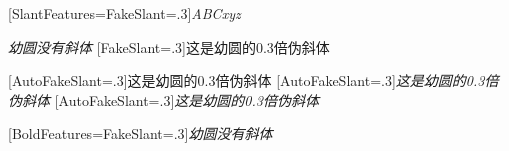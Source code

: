 \documentclass{article}
\begin{document}
{[SlantFeatures={FakeSlant=.3}]\slshape ABCxyz}

{\itshape 幼圆没有斜体}
{[FakeSlant=.3]这是幼圆的0.3倍伪斜体}

{[AutoFakeSlant=.3]这是幼圆的0.3倍伪斜体}
{[AutoFakeSlant=.3]\slshape 这是幼圆的0.3倍伪斜体}
{[AutoFakeSlant=.3]\itshape 这是幼圆的0.3倍伪斜体}

{[BoldFeatures={FakeSlant=.3}]\itshape 幼圆没有斜体}

\hrulefill
\end{document}
